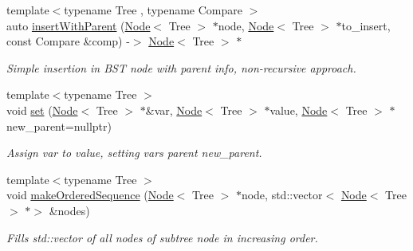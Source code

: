\begin{DoxyCompactItemize}
\mbox{\label{namespacelab_1_1forest_1_1detail_a55dbdf697d2acd430c4631fe9f521844}} 
{\footnotesize template$<$typename Tree , typename Compare $>$ }\\auto \hyperlink{namespacelab_1_1forest_1_1detail_a55dbdf697d2acd430c4631fe9f521844}{insert\+With\+Parent} (\hyperlink{structlab_1_1forest_1_1detail_1_1Node}{Node}$<$ Tree $>$ $\ast$node, \hyperlink{structlab_1_1forest_1_1detail_1_1Node}{Node}$<$ Tree $>$ $\ast$to\+\_\+insert, const Compare \&comp) -\/$>$ \hyperlink{structlab_1_1forest_1_1detail_1_1Node}{Node}$<$ Tree $>$ $\ast$
\begin{DoxyCompactList}\small\item\em Simple insertion in B\+ST node with parent info, non-\/recursive approach. \end{DoxyCompactList}\item 
\mbox{\label{namespacelab_1_1forest_1_1detail_ab9ab28094d14db3c2db76078fc30e7d1}} 
{\footnotesize template$<$typename Tree $>$ }\\void \hyperlink{namespacelab_1_1forest_1_1detail_ab9ab28094d14db3c2db76078fc30e7d1}{set} (\hyperlink{structlab_1_1forest_1_1detail_1_1Node}{Node}$<$ Tree $>$ $\ast$\&var, \hyperlink{structlab_1_1forest_1_1detail_1_1Node}{Node}$<$ Tree $>$ $\ast$value, \hyperlink{structlab_1_1forest_1_1detail_1_1Node}{Node}$<$ Tree $>$ $\ast$new\+\_\+parent=nullptr)
\begin{DoxyCompactList}\small\item\em Assign var to value, setting var\textquotesingle{}s parent new\+\_\+parent. \end{DoxyCompactList}\item 
\mbox{\label{namespacelab_1_1forest_1_1detail_a14b2355c9f8bcb8e2e625e19635ad723}} 
{\footnotesize template$<$typename Tree $>$ }\\void \hyperlink{namespacelab_1_1forest_1_1detail_a14b2355c9f8bcb8e2e625e19635ad723}{make\+Ordered\+Sequence} (\hyperlink{structlab_1_1forest_1_1detail_1_1Node}{Node}$<$ Tree $>$ $\ast$node, std\+::vector$<$ \hyperlink{structlab_1_1forest_1_1detail_1_1Node}{Node}$<$ Tree $>$ $\ast$$>$ \&nodes)
\begin{DoxyCompactList}\small\item\em Fills std\+::vector of all nodes of subtree \textquotesingle{}node\textquotesingle{} in increasing order. \end{DoxyCompactList}\item 
$$
\end{DoxyCompactItemize}
